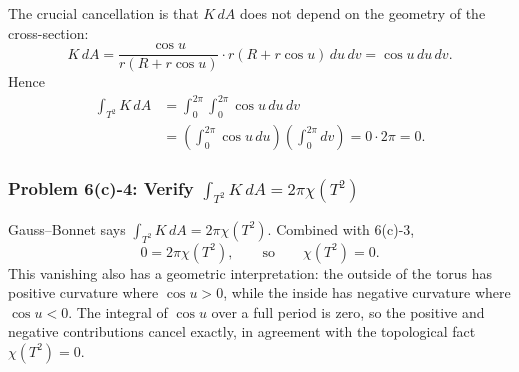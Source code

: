 \documentclass[11pt]{article}
\begin{document}
The crucial cancellation is that $K\,dA$ does not depend on the geometry of the cross-section:
\[
 K\,dA
 =
 \frac{\cos u}{r(R+r\cos u)}\cdot
 r(R+r\cos u)\,du\,dv
 =
 \cos u\,du\,dv.
\]
Hence
\[
\begin{aligned}
 \int_{T^2}K\,dA
 &=
 \int_0^{2\pi}\int_0^{2\pi}
 \cos u\,du\,dv\\
 &=
 \left(\int_0^{2\pi}\cos u\,du\right)
 \left(\int_0^{2\pi}dv\right)
 =0\cdot 2\pi=0.
\end{aligned}
\]

\subsubsection*{Problem 6(c)-4: Verify $\int_{T^2}K\,dA=2\pi\chi(T^2)$}

Gauss--Bonnet says $\int_{T^2}K\,dA=2\pi\chi(T^2)$. Combined with 6(c)-3,
\[
 0=2\pi\chi(T^2),
\qquad\text{so}\qquad
 \chi(T^2)=0.
\]
This vanishing also has a geometric interpretation: the outside of the torus has positive curvature where $\cos u>0$, while the inside has negative curvature where $\cos u<0$. The integral of $\cos u$ over a full period is zero, so the positive and negative contributions cancel exactly, in agreement with the topological fact $\chi(T^2)=0$.
\end{document}
